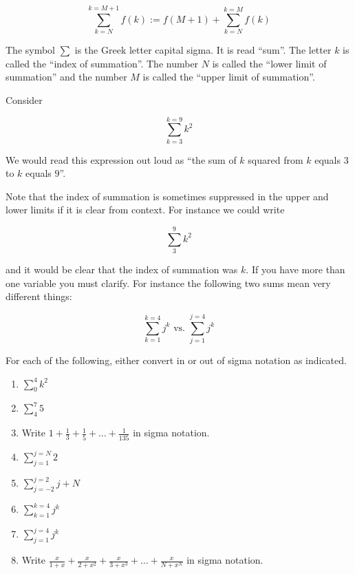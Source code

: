 \[
\sum_{k=N}^{k=M+1} f(k) := f(M+1) + \sum_{k=N}^{k=M} f(k)
\]

The symbol $\sum$ is the Greek letter capital sigma.  It is read ``sum''.  The letter $k$ is called the ``index of summation''.  The number $N$ is called the ``lower limit of summation'' and the number $M$ is called the ``upper limit of summation''.

Consider
 
\[
\sum_{k=3}^{k=9} k^2 
\]

We would read this expression out loud as ``the sum of $k$ squared from $k$ equals $3$ to $k$ equals $9$''.  

Note that the index of summation is sometimes suppressed in the upper and lower limits if it is clear from context.  For instance we could write

\[
\sum_{3}^{9} k^2 
\]

and it would be clear that the index of summation was $k$.  If you have more than one variable you must clarify.  For instance the following two sums mean very different things:

\[
\sum_{k=1}^{k=4} j^k \textrm{ vs. } \sum_{j=1}^{j=4} j^k
\]


\begin{example}
	For each of the following, either convert in or out of sigma notation as indicated.  

	\begin{enumerate}
			\item $\displaystyle\sum_0^4 k^2$
			\item $\displaystyle\sum_4^7 5$
			\item Write $1 + \frac{1}{3} + \frac{1}{5} + \dots + \frac{1}{135}$ in sigma notation.
			\item $\displaystyle\sum_{j=1}^{j=N} 2$
			\item $\displaystyle\sum_{j=-2}^{j=2} j+N$
			\item $\displaystyle\sum_{k=1}^{k=4} j^k $
			\item $\displaystyle\sum_{j=1}^{j=4} j^k$
			\item Write $\frac{x}{1+x} + \frac{x}{2+x^2} + \frac{x}{3 + x^3} + \dots + \frac{x}{N + x^N} $ in sigma notation.
		\end{enumerate}
	\end{example}


